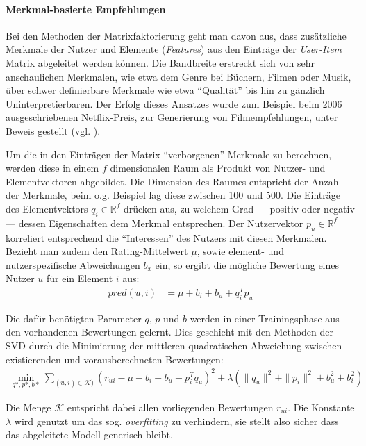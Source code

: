 \paragraph{Merkmal-basierte Empfehlungen} Bei den Methoden der Matrixfaktorierung geht man davon aus, dass zusätzliche Merkmale der Nutzer und Elemente (\textit{Features}) aus den Einträge der \textit{User-Item} Matrix abgeleitet werden können. Die Bandbreite erstreckt sich von sehr anschaulichen Merkmalen, wie etwa dem Genre bei Büchern, Filmen oder Musik, über schwer definierbare Merkmale wie etwa ``Qualität'' bis hin zu gänzlich Uninterpretierbaren. Der Erfolg dieses Ansatzes wurde zum Beispiel beim 2006 ausgeschriebenen Netflix-Preis, zur Generierung von Filmempfehlungen, unter Beweis gestellt (vgl. \citep{Koren:2009:MFT:1608565.1608614}).

Um die in den Einträgen der Matrix ``verborgenen'' Merkmale zu berechnen, werden diese in einem $f$ dimensionalen Raum als Produkt von Nutzer- und Elementvektoren abgebildet. Die Dimension des Raumes entspricht der Anzahl der Merkmale, beim o.g. Beispiel lag diese zwischen 100 und 500. Die Einträge des Elementvektors $q_i \in \mathbb{R}^f$ drücken aus, zu welchem Grad --- positiv oder negativ --- dessen Eigenschaften dem Merkmal entsprechen. Der Nutzervektor $p_u \in \mathbb{R}^f$ korreliert entsprechend die ``Interessen'' des Nutzers mit diesen Merkmalen. Bezieht man zudem den Rating-Mittelwert $\mu$, sowie element- und nutzerspezifische Abweichungen $b_x$ ein, so ergibt die mögliche Bewertung eines Nutzer $u$ für ein Element $i$ aus:
\begin{align}
pred(u,i) & = \mu + b_i + b_u + q_i^T p_u \label{form:calcpredsvd}
\end{align}

Die dafür benötigten Parameter $q$, $p$ und $b$ werden in einer Trainingsphase aus den vorhandenen Bewertungen gelernt. Dies geschieht mit den Methoden der \acf{SVD} durch die Minimierung der mittleren quadratischen Abweichung zwischen existierenden und vorausberechneten Bewertungen:
\begin{align}
\min_{q*,p*,b*}{ \sum_{(u,i) \in \mathcal{K})} (r_{ui} -\mu-b_i - b_u - p_i^T q_u)^2  + \lambda ( \|q_u\|^2 + \|p_i\|^2 + b_u^2 + b_i^2) \label{form:trainsvd}   }
\end{align}

Die Menge $\mathcal{K}$ entspricht dabei allen vorliegenden Bewertungen $r_{ui}$. Die Konstante $\lambda$ wird genutzt um das sog. \textit{overfitting} zu verhindern, sie stellt also sicher dass das abgeleitete Modell generisch bleibt.  \citep{Koren:2009:MFT:1608565.1608614, hb_05}


